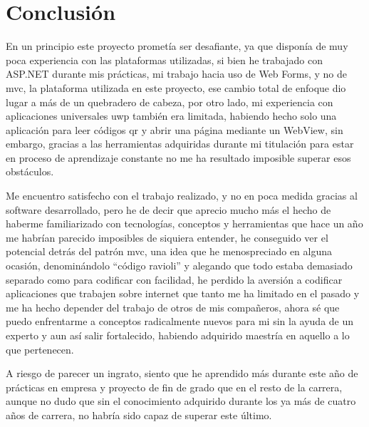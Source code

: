 \chapter{Conclusión}

En un principio este proyecto prometía ser desafiante, ya que disponía de muy poca experiencia con las plataformas utilizadas, si bien he trabajado con ASP.NET durante mis prácticas, mi trabajo hacia uso de Web Forms, y no de \acrshort{mvc}, la plataforma utilizada en este proyecto, ese cambio total de enfoque dio lugar a más de un quebradero de cabeza, por otro lado, mi experiencia con aplicaciones universales \acrshort{uwp} también era limitada, habiendo hecho solo una aplicación para leer códigos \acrshort{qr} y abrir una página mediante un WebView, sin embargo, gracias a las herramientas adquiridas durante mi titulación para estar en proceso de aprendizaje constante no me ha resultado imposible superar esos obstáculos.

Me encuentro satisfecho con el trabajo realizado, y no en poca medida gracias al software desarrollado, pero he de decir que aprecio mucho más el hecho de haberme familiarizado con tecnologías, conceptos y herramientas que hace un año me habrían parecido imposibles de siquiera entender, he conseguido ver el potencial detrás del patrón \acrshort{mvc}, una idea que he menospreciado en alguna ocasión, denominándolo “código ravioli” y alegando que todo estaba demasiado separado como para codificar con facilidad, he perdido la aversión a codificar aplicaciones que trabajen sobre internet que tanto me ha limitado en el pasado y me ha hecho depender del trabajo de otros de mis compañeros, ahora sé que puedo enfrentarme a conceptos radicalmente nuevos para mi sin la ayuda de un experto y aun así salir fortalecido, habiendo adquirido maestría en aquello a lo que pertenecen.

A riesgo de parecer un ingrato, siento que he aprendido más durante este año de prácticas en empresa y proyecto de fin de grado que en el resto de la carrera, aunque no dudo que sin el conocimiento adquirido durante los ya más de cuatro años de carrera, no habría sido capaz de superar este último.
